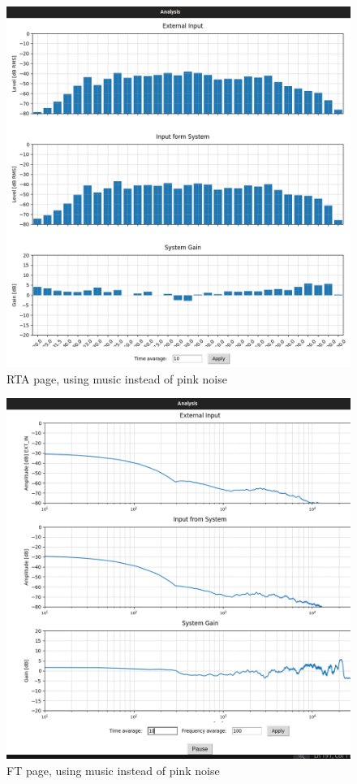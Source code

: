 \begin{figure}[H]
	\centering
	\includegraphics[width=0.8
	\linewidth]{Figures/Coro_Music_EQ_X32.png}
	\caption{RTA page, using music instead of pink noise}
	\label{fig:Coro_RTA_music}
\end{figure}

\begin{figure}[H]
	\centering
	\includegraphics[width=0.8
	\linewidth]{Figures/Coro_FT_music_EQX32.png}
	\caption{FT page, using music instead of pink noise}
	\label{fig:Coro_FT_music}
\end{figure}

